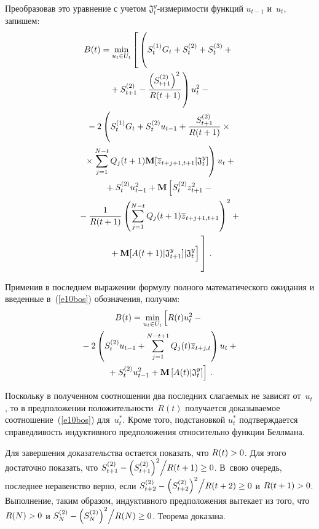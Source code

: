 \begin{multicols}{2}
  Преобразовав это уравнение с учетом $\mathfrak{J}_t^y$-из\-ме\-ри\-мости функций 
$u_{t-1}$ и~$u_t$, запишем:
  \begin{multline*}
  B(t) =\min\limits_{u_t\in U_t} \left[
  \vphantom{\fr{\left(S^{(2)}_{t+1}\right)^2}{R(t+1)}}
  \left( \vphantom{  \fr{\left(S^{(2)}_{t+1}\right)^2}{R(t+1)}}
  S_t^{(1)} G_t+S_t^{(2)}+S_t^{(3)}+{}\right.\right.\\
\left.  {}+S^{(2)}_{t+1}-
  \fr{\left(S^{(2)}_{t+1}\right)^2}{R(t+1)}\right) u_t^2-{}\\
  {}-2\left( 
  \vphantom{\sum\limits_{j=1}^{N-t}}
  S_t^{(1)}G_t +S_t^{(2)}u_{t-1}+\fr{S_{t+1}^{(2)}}{R(t+1)}\times{}\right.\\
\left.  {}\times\sum\limits_{j=1}^{N-t}Q_j(t+1)\mathbf{M}[\overline{z}_{t+j+1,t+1}\vert \mathfrak{J}_t^y]\right) u_t+{}\\
  {}+ S_t^{(2)} u^2_{t-1}+\mathbf{M}\left[ S_t^{(2)} z_{t+1}^2-{}\right.\\
\left.  {}-\fr{1}{R(t+1)}\left( 
\sum\limits_{j=1}^{N-t}Q_j(t+1) \overline{z}_{t+j+1,t+1}\right)^2+{}\right.\\
\left.\left.{}+\mathbf{M}[A(t+1)\vert 
\mathfrak{J}^y_{t+1}]
  \vert
  \mathfrak{J}_t^y
\vphantom{S_t^{(2)} z_{t+1}^2}  \right]
  \vphantom{\fr{\left(S^{(2)}_{t+1}\right)^2}{R(t+1)}}
  \right]\,.
  \end{multline*}
  
  Применив в последнем выражении формулу полного математического ожидания и 
введенные в~(\ref{e10bos}) обозначения, получим:
  \begin{multline*}
  B(t)=\min\limits_{u_t\in U_t}\left[ 
  \vphantom{S_t^{(2)} u^2_{t-1}}
  R(t) u_t^2-{}\right.\\
 {}-2\left( %
  S_t^{(2)}u_{t-1}+ \sum\limits_{j=1}^{N-t+1} 
Q_j(t)\overline{z}_{t+j,t}\right)u_t+{}\\
\left.  {}+S_t^{(2)} u^2_{t-1}+\mathbf{M}\left[A(t)\vert \mathfrak{J}_t^y\right]
  \right]\,.
  \end{multline*}

  Поскольку в полученном соотношении два последних слагаемых не зависят от~$u_t$, то в 
предположении положительности~$R(t)$ получается доказываемое 
соотношение~(\ref{e10bos}) для~$u_t^*$. Кроме того, подстановкой $u_t^*$ подтверждается 
справедливость индуктивного предположения относительно функции Беллмана.
  
  Для завершения доказательства остается показать, что $R(t)\hm>0$. Для этого достаточно 
показать, что $S_{t+1}^{(2)}-\left(S^{(2)}_{t+1}\right)^2\!\Big/R(t+1)\hm\geq0$. В~свою очередь, последнее 
неравенство верно, если $S_{t+2}^{(2)} -\left(S_{t+2}^{(2)}\right)^2\!\Big/R(t+2)\hm\geq 0$ и $R(t+1)\hm>0$. 
Выполнение, таким образом, индуктивного предположения вытекает из того, что 
$R(N)\hm>0$ и  $S_N^{(2)}-\left(S_N^{(2)}\right)^2\!\Big/R(N)\hm\geq0$. Теорема доказана.
  \medskip
  

\end{multicols}
